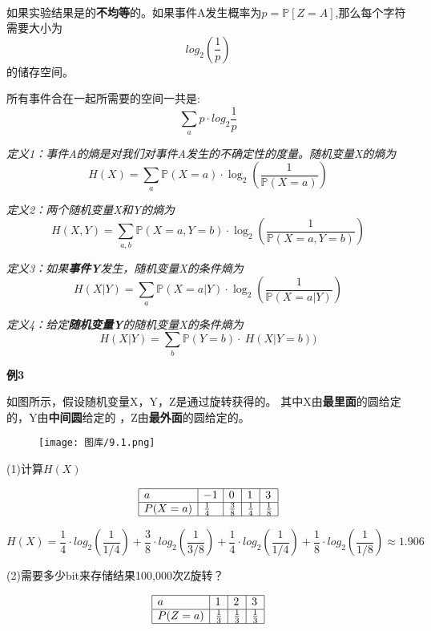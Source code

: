 \documentclass{article}
\begin{document}
~\\

如果实验结果是的\textbf{不均等}的。如果事件A发生概率为$p=\mathbb{P}[Z=A]$,那么每个字符需要大小为
$$log_2(\frac{1}{p})$$
的储存空间。

所有事件合在一起所需要的空间一共是:
$$\sum_a p\cdot log_2{\frac{1}{p}}$$

\textit{定义1：事件A的熵是对我们对事件A发生的不确定性的度量。随机变量X的熵为
$$
H(X)=\sum_{a} \mathbb{P}(X=a) \cdot \log _{2}\left(\frac{1}{\mathbb{P}(X=a)}\right)
$$
}

\textit{定义2：两个随机变量X和Y的熵为
$$
H(X, Y)=\sum_{a, b} \mathbb{P}(X=a, Y=b) \cdot \log _{2}\left(\frac{1}{\mathbb{P}(X=a, Y=b)}\right)
$$
}

\textit{定义3：如果\textbf{事件Y}发生，随机变量X的条件熵为
$$
H(X|Y)=\sum_{a} \mathbb{P}(X=a|Y) \cdot \log _{2}\left(\frac{1}{\mathbb{P}(X=a|Y)}\right)
$$
}

\textit{定义4：给定\textbf{随机变量Y}的随机变量X的条件熵为
$$
H(X|Y)=\sum_{b} \mathbb{P}(Y=b) \cdot \ H(X|Y=b))
$$
}


\textbf{例3}

如图所示，假设随机变量X，Y，Z是通过旋转获得的。
其中X由\textbf{最里面}的圆给定的，Y由\textbf{中间圆}给定的
，Z由\textbf{最外面}的圆给定的。

\begin{figure}[H] %
\centering %
\texttt{[image: 图库/9.1.png]} %
\label{Fig.main2} %
\end{figure}

(1)计算$H(X)$

$$
\begin{array}{|l|l|l|l|l|}
\hline
a&-1&0&1&3\\
\hline
P(X=a)&\frac{1}{4}&\frac{3}{8}&\frac{1}{4}&\frac{1}{8}\\
\hline
\end{array}
$$

$$H(X) = \frac{1}{4} \cdot log_2(\frac{1}{1/4})+\frac{3}{8} \cdot log_2(\frac{1}{3/8})+\frac{1}{4} \cdot log_2(\frac{1}{1/4})+\frac{1}{8} \cdot log_2(\frac{1}{1/8}) \approx 1.906$$

(2)需要多少bit来存储结果100,000次Z旋转？

$$
\begin{array}{|l|l|l|l|}
\hline
a&1&2&3\\
\hline
P(Z=a)&\frac{1}{3}&\frac{1}{3}&\frac{1}{3}\\
\hline
\end{array}
$$
\end{document}
